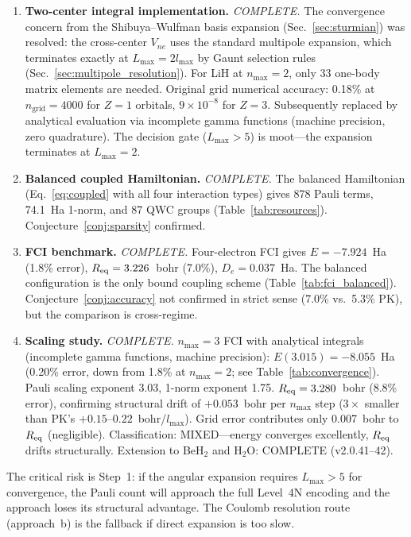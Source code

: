 \documentclass[aps,pra,twocolumn,superscriptaddress,longbibliography]{revtex4-2}
\begin{document}
\begin{enumerate}
\item \textbf{Two-center integral implementation.}  \emph{COMPLETE.}
  The convergence concern from the Shibuya--Wulfman basis expansion
  (Sec.~\ref{sec:sturmian}) was resolved: the cross-center $V_{ne}$
  uses the standard multipole expansion, which terminates exactly at
  $L_{\max} = 2 l_{\max}$ by Gaunt selection rules
  (Sec.~\ref{sec:multipole_resolution}).  For LiH at $n_{\max} = 2$,
  only 33 one-body matrix elements are needed.  Original grid numerical accuracy:
  0.18\% at $n_{\mathrm{grid}} = 4000$ for $Z = 1$ orbitals,
  $9 \times 10^{-8}$ for $Z = 3$.  Subsequently replaced by analytical
  evaluation via incomplete gamma functions (machine precision, zero
  quadrature).  The decision gate ($L_{\max} > 5$)
  is moot---the expansion terminates at $L_{\max} = 2$.

\item \textbf{Balanced coupled Hamiltonian.}  \emph{COMPLETE.}
  The balanced Hamiltonian (Eq.~\ref{eq:coupled} with all four
  interaction types) gives 878 Pauli terms, 74.1~Ha 1-norm, and
  87 QWC groups (Table~\ref{tab:resources}).
  Conjecture~\ref{conj:sparsity} confirmed.

\item \textbf{FCI benchmark.}  \emph{COMPLETE.}
  Four-electron FCI gives $E = -7.924$~Ha (1.8\% error),
  $R_{\rm eq} = 3.226$~bohr (7.0\%), $D_e = 0.037$~Ha.
  The balanced configuration is the only bound coupling scheme
  (Table~\ref{tab:fci_balanced}).  Conjecture~\ref{conj:accuracy}
  not confirmed in strict sense (7.0\% vs.\ 5.3\% PK), but the
  comparison is cross-regime.

\item \textbf{Scaling study.}  \emph{COMPLETE.}  $n_{\max} = 3$
  FCI with analytical integrals (incomplete gamma functions, machine
  precision): $E(3.015) = -8.055$~Ha (0.20\% error, down from 1.8\%
  at $n_{\max} = 2$; see Table~\ref{tab:convergence}).
  Pauli scaling exponent 3.03, 1-norm exponent 1.75.
  $R_{\rm eq} = 3.280$~bohr (8.8\% error), confirming structural drift
  of $+0.053$~bohr per $n_{\max}$ step ($3\times$ smaller than PK's
  $+0.15$--$0.22$~bohr/$l_{\max}$).  Grid error contributes only
  0.007~bohr to $R_{\rm eq}$ (negligible).  Classification: MIXED---energy
  converges excellently, $R_{\rm eq}$ drifts structurally.
  Extension to BeH$_2$ and H$_2$O: COMPLETE (v2.0.41--42).
\end{enumerate}

The critical risk is Step~1: if the angular expansion requires
$L_{\max} > 5$ for convergence, the Pauli count will approach the
full Level~4N encoding and the approach loses its structural advantage.
The Coulomb resolution route (approach~b) is the fallback if direct
expansion is too slow.
\end{document}

